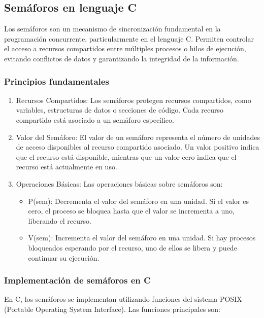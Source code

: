 \subsection{Semáforos en lenguaje C}

Los semáforos son un mecanismo de sincronización fundamental en la programación concurrente, particularmente en el lenguaje C. Permiten controlar el acceso a recursos compartidos entre múltiples procesos o hilos de ejecución, evitando conflictos de datos y garantizando la integridad de la información.

\subsubsection{Principios fundamentales}

\begin{enumerate}
	\def\labelenumi{\arabic{enumi}.}
	\item   Recursos Compartidos: Los semáforos protegen recursos compartidos,   como variables, estructuras de datos o secciones de código. Cada   recurso compartido está asociado a un semáforo específico.
	\item   Valor del Semáforo: El valor de un semáforo representa el número de   unidades de acceso disponibles al recurso compartido asociado. Un   valor positivo indica que el recurso está disponible, mientras que un   valor cero indica que el recurso está actualmente en uso.
	\item   Operaciones Básicas: Las operaciones básicas sobre semáforos son:
	\begin{itemize}
		\item P(sem): Decrementa el valor del semáforo en una unidad. Si el valor     es cero, el proceso se bloquea hasta que el valor se incrementa a     uno, liberando el recurso.
		\item V(sem): Incrementa el valor del semáforo en una unidad. Si hay     procesos bloqueados esperando por el recurso, uno de ellos se libera     y puede continuar su ejecución.
	\end{itemize}
\end{enumerate}

\subsubsection{Implementación de semáforos en C}

En C, los semáforos se implementan utilizando funciones del sistema POSIX (Portable Operating System Interface). Las funciones principales son:

